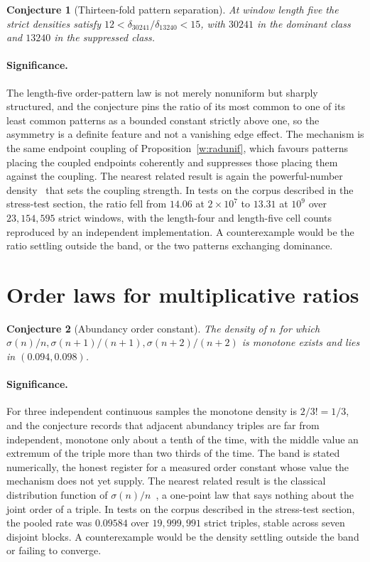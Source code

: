 \documentclass[11pt]{article}
\newtheorem{conjecture}{Conjecture}
\theoremstyle{definition}
\begin{document}
\begin{conjecture}[Thirteen-fold pattern separation]\label{w8}
At window length five the strict densities satisfy $12<\delta_{30241}/\delta_{13240}<15$, with $30241$ in the dominant class and $13240$ in the suppressed class.
\end{conjecture}

\paragraph{Significance.}
The length-five order-pattern law is not merely nonuniform but sharply structured, and the conjecture pins the ratio of its most common to one of its least common patterns as a bounded constant strictly above one, so the asymmetry is a definite feature and not a vanishing edge effect.  The mechanism is the same endpoint coupling of Proposition~\ref{w:radunif}, which favours patterns placing the coupled endpoints coherently and suppresses those placing them against the coupling.  The nearest related result is again the powerful-number density~\cite{Ten} that sets the coupling strength.  In tests on the corpus described in the stress-test section, the ratio fell from $14.06$ at $2\times10^7$ to $13.31$ at $10^9$ over $23{,}154{,}595$ strict windows, with the length-four and length-five cell counts reproduced by an independent implementation.  A counterexample would be the ratio settling outside the band, or the two patterns exchanging dominance.

\section{Order laws for multiplicative ratios}

\begin{conjecture}[Abundancy order constant]\label{w9}
The density of $n$ for which $\sigma(n)/n,\sigma(n+1)/(n+1),\sigma(n+2)/(n+2)$ is monotone exists and lies in $(0.094,0.098)$.
\end{conjecture}

\paragraph{Significance.}
For three independent continuous samples the monotone density is $2/3!=1/3$, and the conjecture records that adjacent abundancy triples are far from independent, monotone only about a tenth of the time, with the middle value an extremum of the triple more than two thirds of the time.  The band is stated numerically, the honest register for a measured order constant whose value the mechanism does not yet supply.  The nearest related result is the classical distribution function of $\sigma(n)/n$~\cite{Ten}, a one-point law that says nothing about the joint order of a triple.  In tests on the corpus described in the stress-test section, the pooled rate was $0.09584$ over $19{,}999{,}991$ strict triples, stable across seven disjoint blocks.  A counterexample would be the density settling outside the band or failing to converge.
\end{document}
